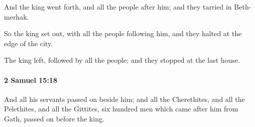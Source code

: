 			\begin{versebox}
					\item[BHS] 
					\item[ASV] And the king went forth, and all the people after him; and they tarried in Beth-merhak.
					\item[NIV] So the king set out, with all the people following him, and they halted at the edge of the city.
					\item[NRSV] The king left, followed by all the people; and they stopped at the last house.
			\end{versebox}

		\paragraph{2 Samuel 15:18} %
			\label{2SAMUEL-15-18}

			And all his servants passed on beside him; and all the Cherethites, and all the Pelethites, and all the Gittites, six hundred men which came after him from Gath, passed on before the king.

